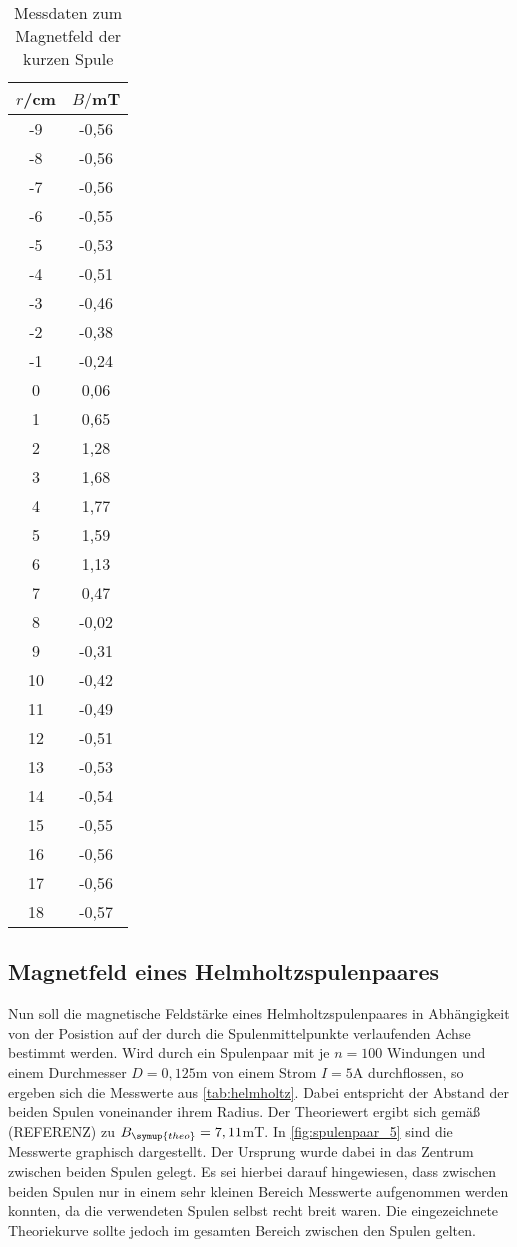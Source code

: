 \begin{table}
  \centering
  \caption{Messdaten zum Magnetfeld der kurzen Spule}
    \label{tab:kurze_spule}
    \begin{tabular}{c c}
      \toprule
      $r$/cm & $B/$mT \\
      \midrule
      -9  &	  -0,56\\
      -8  &	  -0,56\\
      -7	&  -0,56\\
      -6	&  -0,55\\
      -5	&  -0,53\\
      -4	&  -0,51\\
      -3	&  -0,46\\
      -2	&  -0,38\\
      -1	&  -0,24\\
      0	  &   0,06\\
      1	  &   0,65\\
      2	  &   1,28\\
      3	  &   1,68\\
      4	  &   1,77\\
      5	  &   1,59\\
      6	  &   1,13\\
      7	  &   0,47\\
      8	  &  -0,02\\
      9	  &  -0,31\\
      10	&  -0,42\\
      11	&  -0,49\\
      12	&  -0,51\\
      13	&  -0,53\\
      14	&  -0,54\\
      15	&  -0,55\\
      16	&  -0,56\\
      17	&  -0,56\\
      18	&  -0,57\\
      \bottomrule
    \end{tabular}
\end{table}

\subsection{Magnetfeld eines Helmholtzspulenpaares}

Nun soll die magnetische Feldstärke eines Helmholtzspulenpaares in Abhängigkeit von
der Posistion auf der durch die Spulenmittelpunkte verlaufenden Achse bestimmt werden.
Wird durch ein Spulenpaar mit je $n=100$ Windungen und einem Durchmesser $D=0,125$m
von einem Strom $I=5$A durchflossen, so ergeben sich die Messwerte aus \ref{tab:helmholtz}.
Dabei entspricht der Abstand der beiden Spulen voneinander ihrem Radius.
Der Theoriewert ergibt sich gemäß (REFERENZ) zu $B_{\symup{theo}}=7,11$mT. In
\ref{fig:spulenpaar_5} sind die Messwerte graphisch dargestellt. Der Ursprung wurde
dabei in das Zentrum zwischen beiden Spulen gelegt. Es sei hierbei darauf
hingewiesen, dass zwischen beiden Spulen nur in einem sehr kleinen Bereich Messwerte
aufgenommen werden konnten, da die verwendeten Spulen selbst recht breit waren. Die
eingezeichnete Theoriekurve sollte jedoch im gesamten Bereich zwischen den Spulen
gelten.

